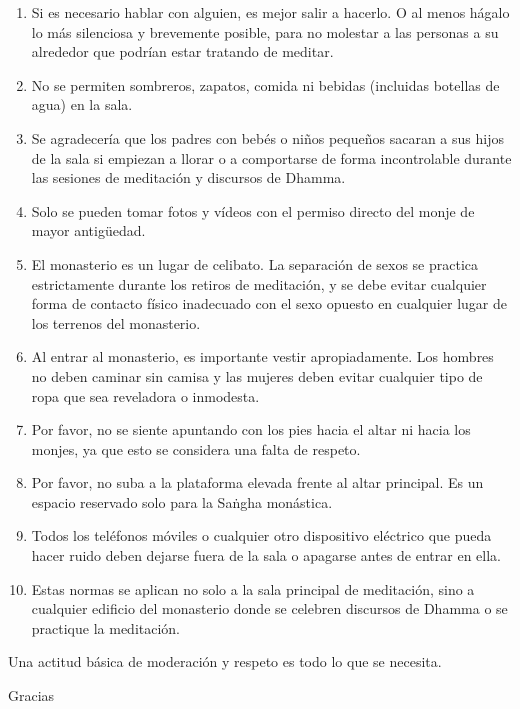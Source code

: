 \begin{enumerate}
\item Si es necesario hablar con alguien, es mejor salir a hacerlo. O al menos hágalo lo más silenciosa y brevemente posible, para no molestar a las personas a su alrededor que podrían estar tratando de meditar.

\item No se permiten sombreros, zapatos, comida ni bebidas (incluidas botellas de agua) en la sala.

\item Se agradecería que los padres con bebés o niños pequeños sacaran a sus hijos de la sala si empiezan a llorar o a comportarse de forma incontrolable durante las sesiones de meditación y discursos de Dhamma.

\item Solo se pueden tomar fotos y vídeos con el permiso directo del monje de mayor antigüedad.

\item El monasterio es un lugar de celibato. La separación de sexos se practica estrictamente durante los retiros de meditación, y se debe evitar cualquier forma de contacto físico inadecuado con el sexo opuesto en cualquier lugar de los terrenos del monasterio.

\item Al entrar al monasterio, es importante vestir apropiadamente. Los hombres no deben caminar sin camisa y las mujeres deben evitar cualquier tipo de ropa que sea reveladora o inmodesta.

\item Por favor, no se siente apuntando con los pies hacia el altar ni hacia los monjes, ya que esto se considera una falta de respeto.

\item Por favor, no suba a la plataforma elevada frente al altar principal. Es un espacio reservado solo para la Saṅgha monástica.

\item Todos los teléfonos móviles o cualquier otro dispositivo eléctrico que pueda hacer ruido deben dejarse fuera de la sala o apagarse antes de entrar en ella.

\item Estas normas se aplican no solo a la sala principal de meditación, sino a cualquier edificio del monasterio donde se celebren discursos de Dhamma o se practique la meditación.
\end{enumerate}
Una actitud básica de moderación y respeto es todo lo que se necesita.

Gracias




